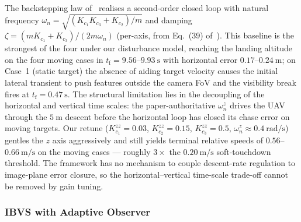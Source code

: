 \documentclass[10pt,journal]{IEEEtran}
\begin{document}
The backstepping law of~\cite{zhang2026} realises a second-order closed loop with natural frequency $\omega_n=\sqrt{(K_{c_1}K_{c_3}+K_{c_2})/m}$ and damping $\zeta=(mK_{c_1}+K_{c_3})/(2m\omega_n)$ (per-axis, from Eq.~(39) of~\cite{zhang2026}). This baseline is the strongest of the four under our disturbance model, reaching the landing altitude on the four moving cases in $t_\text{f}=9.56$--$9.93~\text{s}$ with horizontal error $0.17$--$0.24~\text{m}$; on Case~1 (static target) the absence of aiding target velocity causes the initial lateral transient to push features outside the camera FoV and the visibility break fires at $t_\text{f}=0.47~\text{s}$. The structural limitation lies in the decoupling of the horizontal and vertical time scales: the paper-authoritative $\omega_n^z$ drives the UAV through the $5~\text{m}$ descent before the horizontal loop has closed its chase error on moving targets. Our retune ($K_{c_1}^{zz}=0.03$, $K_{c_2}^{zz}=0.15$, $K_{c_3}^{zz}=0.5$, $\omega_n^z\approx 0.4~\text{rad/s}$) gentles the $z$ axis aggressively and still yields terminal relative speeds of $0.56$--$0.66~\text{m/s}$ on the moving cases --- roughly $3\times$ the $0.20~\text{m/s}$ soft-touchdown threshold. The framework has no mechanism to couple descent-rate regulation to image-plane error closure, so the horizontal--vertical time-scale trade-off cannot be removed by gain tuning.

\subsubsection{IBVS with Adaptive Observer \cite{chen2025}}
\end{document}

